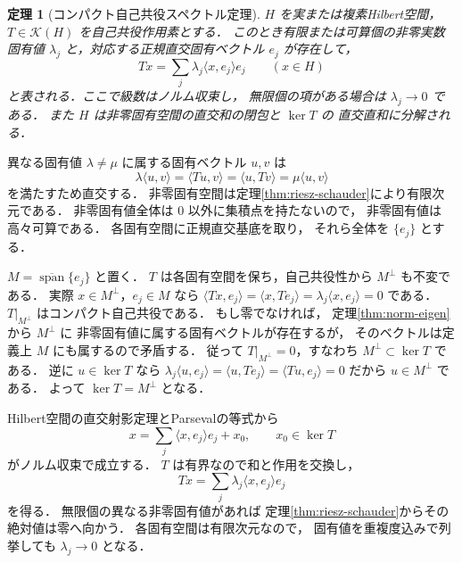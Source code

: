 \documentclass[a5paper,10pt,onecolumn]{jsarticle}
\makeatletter
\theoremstyle{mathnotetheorem}
\newtheorem{theorem}{定理}[section]
\renewcommand{\proofname}{証明}
\renewenvironment{proof}[1][\proofname]{%
  \par\pushQED{\qed}\normalfont\topsep4\p@\@plus2\p@\relax
  \trivlist\item[\hskip\labelsep\bfseries #1]\ignorespaces
}{\popQED\endtrivlist\@endpefalse}
\makeatother
\begin{document}
\begin{theorem}[コンパクト自己共役スペクトル定理]
\label{thm:compact-spectral}
$H$ を実または複素Hilbert空間，
$T\in\mathcal K(H)$ を自己共役作用素とする．
このとき有限または可算個の非零実数固有値
$\lambda_j$ と，対応する正規直交固有ベクトル $e_j$
が存在して，
\[
 Tx=\sum_j\lambda_j\langle x,e_j\rangle e_j
 \qquad(x\in H)
\]
と表される．ここで級数はノルム収束し，
無限個の項がある場合は $\lambda_j\to0$ である．
また $H$ は非零固有空間の直交和の閉包と $\ker T$ の
直交直和に分解される．
\end{theorem}
\begin{proof}
異なる固有値 $\lambda\ne\mu$ に属する固有ベクトル $u,v$ は
\[
 \lambda\langle u,v\rangle
 =\langle Tu,v\rangle
 =\langle u,Tv\rangle
 =\mu\langle u,v\rangle
\]
を満たすため直交する．
非零固有空間は定理\ref{thm:riesz-schauder}により有限次元である．
非零固有値全体は $0$ 以外に集積点を持たないので，
非零固有値は高々可算である．
各固有空間に正規直交基底を取り，
それら全体を $\{e_j\}$ とする．

$M=\overline{\operatorname{span}}\{e_j\}$ と置く．
$T$ は各固有空間を保ち，自己共役性から
$M^\perp$ も不変である．
実際 $x\in M^\perp$，$e_j\in M$ なら
$\langle Tx,e_j\rangle
 =\langle x,Te_j\rangle
 =\lambda_j\langle x,e_j\rangle=0$
である．
$T|_{M^\perp}$ はコンパクト自己共役である．
もし零でなければ，
定理\ref{thm:norm-eigen}から $M^\perp$ に
非零固有値に属する固有ベクトルが存在するが，
そのベクトルは定義上 $M$ にも属するので矛盾する．
従って $T|_{M^\perp}=0$，すなわち
$M^\perp\subset\ker T$ である．
逆に $u\in\ker T$ なら
$\lambda_j\langle u,e_j\rangle
 =\langle u,Te_j\rangle
 =\langle Tu,e_j\rangle=0$
だから $u\in M^\perp$ である．
よって $\ker T=M^\perp$ となる．

Hilbert空間の直交射影定理とParsevalの等式から
\[
 x=\sum_j\langle x,e_j\rangle e_j+x_0,
 \qquad x_0\in\ker T
\]
がノルム収束で成立する．
$T$ は有界なので和と作用を交換し，
\[
 Tx=\sum_j\lambda_j\langle x,e_j\rangle e_j
\]
を得る．
無限個の異なる非零固有値があれば
定理\ref{thm:riesz-schauder}からその絶対値は零へ向かう．
各固有空間は有限次元なので，
固有値を重複度込みで列挙しても
$\lambda_j\to0$ となる．
\end{proof}
\end{document}
